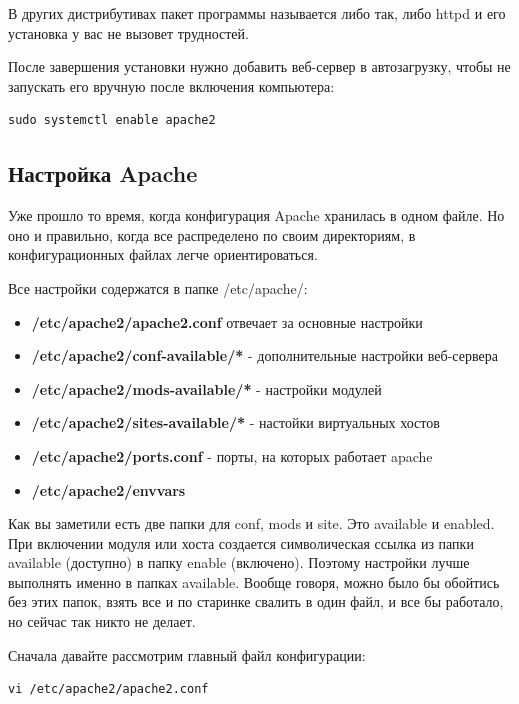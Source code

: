 \documentclass[14pt, a4paper]{article}
\begin{document}
В других дистрибутивах пакет программы называется либо так, либо httpd и его установка у вас не вызовет трудностей.

После завершения установки нужно добавить веб-сервер в 
автозагрузку, чтобы не запускать его вручную после включения компьютера:

\begin{lstlisting}
sudo systemctl enable apache2
\end{lstlisting}

\subsection*{Настройка Apache}
Уже прошло то время, когда конфигурация Apache хранилась в одном файле. Но оно и правильно, когда все распределено по 
своим директориям, в конфигурационных файлах легче ориентироваться.

Все настройки содержатся в папке /etc/apache/:
\begin{itemize}
    \item \textbf{/etc/apache2/apache2.conf} отвечает за основные настройки
    \item \textbf{/etc/apache2/conf-available/*} - дополнительные настройки веб-сервера
    \item \textbf{/etc/apache2/mods-available/*} - настройки модулей
    \item \textbf{/etc/apache2/sites-available/*} - настойки виртуальных хостов
    \item \textbf{/etc/apache2/ports.conf} - порты, на которых работает apache
    \item \textbf{/etc/apache2/envvars}
\end{itemize}
Как вы заметили есть две папки для conf, mods и site. Это available и enabled. При включении модуля 
или хоста создается символическая ссылка из папки available (доступно) в папку enable (включено). 
Поэтому настройки лучше выполнять именно в папках available. Вообще говоря, можно было бы обойтись 
без этих папок, взять все и по старинке свалить в один файл, и все бы работало, но сейчас так никто не делает.

Сначала давайте рассмотрим главный файл конфигурации:
\begin{lstlisting}
vi /etc/apache2/apache2.conf
\end{lstlisting}
\end{document}
